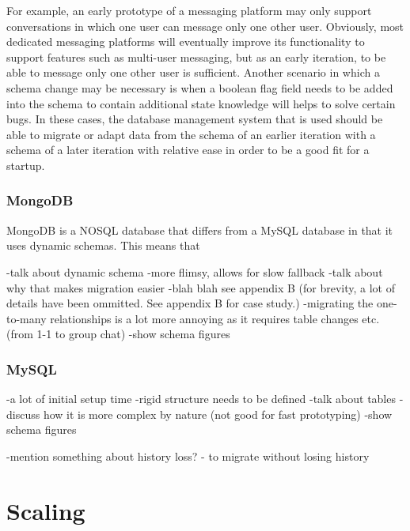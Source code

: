 \documentclass[12pt]{article}
\begin{document}
For example, an early prototype of a messaging platform may only support conversations in which one user can message only one other user. Obviously, most dedicated messaging platforms will eventually improve its functionality to support features such as multi-user messaging, but as an early iteration, to be able to message only one other user is sufficient. Another scenario in which a schema change may be necessary is when a boolean flag field needs to be added into the schema to contain additional state knowledge will helps to solve certain bugs. In these cases, the database management system that is used should be able to migrate or adapt data from the schema of an earlier iteration with a schema of a later iteration with relative ease in order to be a good fit for a startup.

\subsubsection{MongoDB}
MongoDB is a NOSQL database that differs from a MySQL database in that it uses dynamic schemas. This means that

-talk about dynamic schema
-more flimsy, allows for slow fallback
-talk about why that makes migration easier
-blah blah see appendix B (for brevity, a lot of details have been ommitted. See appendix B for case study.) -migrating the one-to-many relationships is a lot more annoying as it requires table changes etc. (from 1-1 to group chat)
-show schema figures

\subsubsection{MySQL}
-a lot of initial setup time
-rigid structure needs to be defined
-talk about tables
-discuss how it is more complex by nature (not good for fast prototyping)
-show schema figures

-mention something about history loss? - to migrate without losing history

\section{Scaling}
\end{document}
